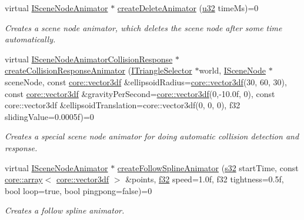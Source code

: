 \begin{DoxyCompactItemize}
virtual \hyperlink{classirr_1_1scene_1_1ISceneNodeAnimator}{I\+Scene\+Node\+Animator} $\ast$ \hyperlink{classirr_1_1scene_1_1ISceneManager_a163cc04ff2cb03852ac891de56200fa3}{create\+Delete\+Animator} (\hyperlink{namespaceirr_a0416a53257075833e7002efd0a18e804}{u32} time\+Ms)=0
\begin{DoxyCompactList}\small\item\em Creates a scene node animator, which deletes the scene node after some time automatically. \end{DoxyCompactList}\item 
virtual \hyperlink{classirr_1_1scene_1_1ISceneNodeAnimatorCollisionResponse}{I\+Scene\+Node\+Animator\+Collision\+Response} $\ast$ \hyperlink{classirr_1_1scene_1_1ISceneManager_a67b266cc40ebd66b5d21c26a78f002be}{create\+Collision\+Response\+Animator} (\hyperlink{classirr_1_1scene_1_1ITriangleSelector}{I\+Triangle\+Selector} $\ast$world, \hyperlink{classirr_1_1scene_1_1ISceneNode}{I\+Scene\+Node} $\ast$scene\+Node, const \hyperlink{namespaceirr_1_1core_ae6e2b2a6c552833ebbd5b7463d03586b}{core\+::vector3df} \&ellipsoid\+Radius=\hyperlink{namespaceirr_1_1core_ae6e2b2a6c552833ebbd5b7463d03586b}{core\+::vector3df}(30, 60, 30), const \hyperlink{namespaceirr_1_1core_ae6e2b2a6c552833ebbd5b7463d03586b}{core\+::vector3df} \&gravity\+Per\+Second=\hyperlink{namespaceirr_1_1core_ae6e2b2a6c552833ebbd5b7463d03586b}{core\+::vector3df}(0,-\/10.\+0f, 0), const core\+::vector3df \&ellipsoid\+Translation=core\+::vector3df(0, 0, 0), f32 sliding\+Value=0.\+0005f)=0
\begin{DoxyCompactList}\small\item\em Creates a special scene node animator for doing automatic collision detection and response. \end{DoxyCompactList}\item 
virtual \hyperlink{classirr_1_1scene_1_1ISceneNodeAnimator}{I\+Scene\+Node\+Animator} $\ast$ \hyperlink{classirr_1_1scene_1_1ISceneManager_ab0c9d4ab88bbe2ad71623b1054a0c3ba}{create\+Follow\+Spline\+Animator} (\hyperlink{namespaceirr_ac66849b7a6ed16e30ebede579f9b47c6}{s32} start\+Time, const \hyperlink{classirr_1_1core_1_1array}{core\+::array}$<$ \hyperlink{namespaceirr_1_1core_ae6e2b2a6c552833ebbd5b7463d03586b}{core\+::vector3df} $>$ \&points, \hyperlink{namespaceirr_a0277be98d67dc26ff93b1a6a1d086b07}{f32} speed=1.\+0f, f32 tightness=0.\+5f, bool loop=true, bool pingpong=false)=0
\begin{DoxyCompactList}\small\item\em Creates a follow spline animator. \end{DoxyCompactList}\item 

\end{DoxyCompactItemize}
